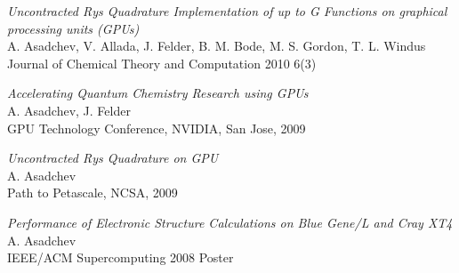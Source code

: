 \documentclass[overlap,line]{cv}
\begin{document}
\begin{resume}
{\it Uncontracted Rys Quadrature Implementation of up to G Functions on graphical processing units (GPUs)} \\
A. Asadchev, V. Allada, J. Felder, B. M. Bode, M. S. Gordon, T. L. Windus \\
Journal of Chemical Theory and Computation 2010 6(3)

{\it Accelerating Quantum Chemistry Research using GPUs} \\
A. Asadchev, J. Felder \\
GPU Technology Conference, NVIDIA, San Jose, 2009


{\it Uncontracted Rys Quadrature on GPU} \\
A. Asadchev \\
Path to Petascale, NCSA, 2009

{\it Performance of Electronic Structure Calculations on Blue Gene/L and Cray XT4} \\
A. Asadchev \\
IEEE/ACM Supercomputing 2008 Poster

\end{resume}
\end{document}
